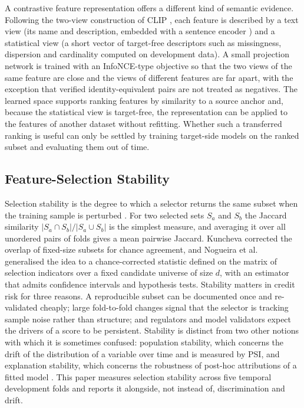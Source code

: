 \documentclass[preprint,12pt]{elsarticle}
\begin{document}
A contrastive feature representation offers a different kind of semantic evidence. Following the two-view construction of CLIP \cite{radford2021}, each feature is described by a text view (its name and description, embedded with a sentence encoder \cite{reimers2019,wang2020minilm}) and a statistical view (a short vector of target-free descriptors such as missingness, dispersion and cardinality computed on development data). A small projection network is trained with an InfoNCE-type objective \cite{oord2018} so that the two views of the same feature are close and the views of different features are far apart, with the exception that verified identity-equivalent pairs are not treated as negatives. The learned space supports ranking features by similarity to a source anchor and, because the statistical view is target-free, the representation can be applied to the features of another dataset without refitting. Whether such a transferred ranking is useful can only be settled by training target-side models on the ranked subset and evaluating them out of time.

\subsection{Feature-Selection Stability}
\label{subsec:fs_stability_background}

Selection stability is the degree to which a selector returns the same subset when the training sample is perturbed \cite{kalousis2007}. For two selected sets $S_a$ and $S_b$ the Jaccard similarity $|S_a\cap S_b|/|S_a\cup S_b|$ \cite{jaccard1901} is the simplest measure, and averaging it over all unordered pairs of folds gives a mean pairwise Jaccard. Kuncheva \cite{kuncheva2007} corrected the overlap of fixed-size subsets for chance agreement, and Nogueira et al.\ \cite{nogueira2018} generalised the idea to a chance-corrected statistic defined on the matrix of selection indicators over a fixed candidate universe of size $d$, with an estimator that admits confidence intervals and hypothesis tests. Stability matters in credit risk for three reasons. A reproducible subset can be documented once and re-validated cheaply; large fold-to-fold changes signal that the selector is tracking sample noise rather than structure; and regulators and model validators expect the drivers of a score to be persistent. Stability is distinct from two other notions with which it is sometimes confused: population stability, which concerns the drift of the distribution of a variable over time and is measured by PSI, and explanation stability, which concerns the robustness of post-hoc attributions of a fitted model \cite{ballegeer2025}. This paper measures selection stability across five temporal development folds and reports it alongside, not instead of, discrimination and drift.
\end{document}
